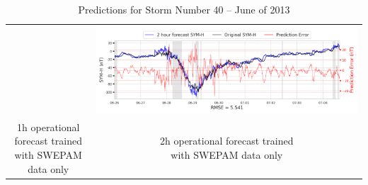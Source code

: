 \documentclass[draft,sw]{agutexSI2019}
\begin{document}
\begin{table}
\begin{tabular}{cc}
&
\includegraphics[width=0.49\linewidth]{paper_plots_shade/2h_swepam_rt/2h_swepam_rt_storm_40.png}
\\
\shortstack{1h operational forecast trained\\ with SWEPAM data only} & \shortstack{2h operational forecast trained\\ with SWEPAM data only}
\vspace*{12pt}
\\
\end{tabular}
\caption{Predictions for Storm Number 40 -- June of 2013}
\label{storm-40}
\end{table}
\end{document}
